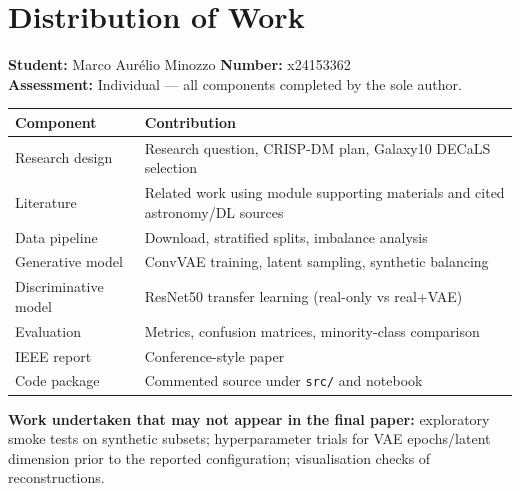 \documentclass[11pt,a4paper]{article}
\begin{document}
\clearpage
\section*{Distribution of Work}
\textbf{Student:} Marco Aur\'{e}lio Minozzo \quad \textbf{Number:} x24153362\\
\textbf{Assessment:} Individual --- all components completed by the sole author.

\begin{tabular}{@{}p{4.2cm}p{9cm}@{}}
\hline
\textbf{Component} & \textbf{Contribution} \\
\hline
Research design & Research question, CRISP-DM plan, Galaxy10 DECaLS selection \\
Literature & Related work using module supporting materials and cited astronomy/DL sources \\
Data pipeline & Download, stratified splits, imbalance analysis \\
Generative model & ConvVAE training, latent sampling, synthetic balancing \\
Discriminative model & ResNet50 transfer learning (real-only vs real+VAE) \\
Evaluation & Metrics, confusion matrices, minority-class comparison \\
IEEE report & Conference-style paper \\
Code package & Commented source under \texttt{src/} and notebook \\
\hline
\end{tabular}

\vspace{1em}
\noindent\textbf{Work undertaken that may not appear in the final paper:} exploratory smoke tests on synthetic subsets; hyperparameter trials for VAE epochs/latent dimension prior to the reported configuration; visualisation checks of reconstructions.
\end{document}
